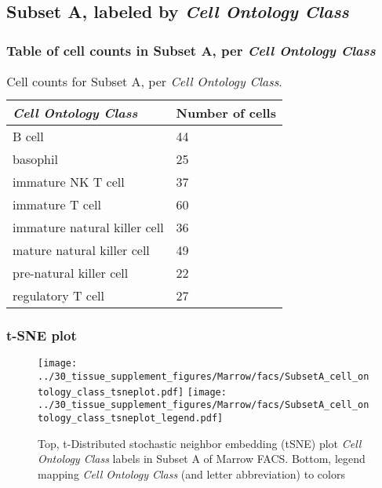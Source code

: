 \clearpage

\subsection{Subset A, labeled by \emph{Cell Ontology Class}}
\subsubsection{Table of cell counts in Subset A, per \emph{Cell Ontology Class}}\begin{table}[h]
\centering
\label{my-label}
\begin{tabular}{@{}ll@{}}
\toprule

\emph{Cell Ontology Class}& Number of cells \\ \midrule
B cell & 44 \\

basophil & 25 \\

immature NK T cell & 37 \\

immature T cell & 60 \\

immature natural killer cell & 36 \\

mature natural killer cell & 49 \\

pre-natural killer cell & 22 \\

regulatory T cell & 27 \\
\bottomrule
\end{tabular}
\caption{Cell counts for Subset A, per \emph{Cell Ontology Class}.}
\end{table}

\clearpage
\subsubsection{t-SNE plot}
\begin{figure}[h]
\centering
\texttt{[image: ../30\_tissue\_supplement\_figures/Marrow/facs/SubsetA\_cell\_ontology\_class\_tsneplot.pdf]}
\texttt{[image: ../30\_tissue\_supplement\_figures/Marrow/facs/SubsetA\_cell\_ontology\_class\_tsneplot\_legend.pdf]}
\caption{Top, t-Distributed stochastic neighbor embedding (tSNE) plot  \emph{Cell Ontology Class} labels in Subset A of Marrow FACS. Bottom, legend mapping \emph{Cell Ontology Class} (and letter abbreviation) to colors}
\end{figure}



